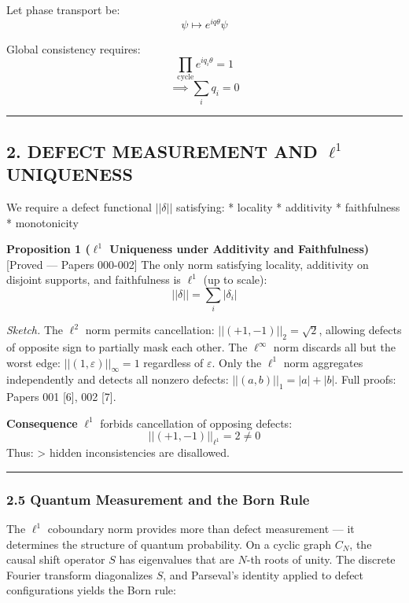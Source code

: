 \documentclass[
]{article}
\begin{document}
Let phase transport be: \[
\psi \mapsto e^{iq\theta} \psi
\]

Global consistency requires: \[
\prod_{\text{cycle}} e^{iq_i \theta} = 1
\] \[
\implies \sum_i q_i = 0
\]

\begin{center}\rule{0.5\linewidth}{0.5pt}\end{center}

\subsection{\texorpdfstring{2. DEFECT MEASUREMENT AND \(\ell^1\)
UNIQUENESS}{2. DEFECT MEASUREMENT AND \textbackslash ell\^{}1 UNIQUENESS}}\label{defect-measurement-and-ell1-uniqueness}

We require a defect functional \(||\delta||\) satisfying: * locality *
additivity * faithfulness * monotonicity

\textbf{Proposition 1 (\(\ell^1\) Uniqueness under Additivity and
Faithfulness)} {[}Proved --- Papers 000-002{]} The only norm satisfying
locality, additivity on disjoint supports, and faithfulness is
\(\ell^1\) (up to scale): \[
||\delta|| = \sum_i |\delta_i|
\]

\emph{Sketch.} The \(\ell^2\) norm permits cancellation:
\(||(+1,-1)||_2 = \sqrt{2}\), allowing defects of opposite sign to
partially mask each other. The \(\ell^\infty\) norm discards all but the
worst edge: \(||(1,\varepsilon)||_\infty = 1\) regardless of
\(\varepsilon\). Only the \(\ell^1\) norm aggregates independently and
detects all nonzero defects: \(||(a,b)||_1 = |a| + |b|\). Full proofs:
Papers 001 {[}6{]}, 002 {[}7{]}.

\textbf{Consequence} \(\ell^1\) forbids cancellation of opposing
defects: \[
||(+1, -1)||_{\ell^1} = 2 \neq 0
\] Thus: \textgreater{} hidden inconsistencies are disallowed.

\begin{center}\rule{0.5\linewidth}{0.5pt}\end{center}

\subsubsection{2.5 Quantum Measurement and the Born
Rule}\label{quantum-measurement-and-the-born-rule}

The \(\ell^1\) coboundary norm provides more than defect measurement ---
it determines the structure of quantum probability. On a cyclic graph
\(C_N\), the causal shift operator \(S\) has eigenvalues that are
\(N\)-th roots of unity. The discrete Fourier transform diagonalizes
\(S\), and Parseval's identity applied to defect configurations yields
the Born rule:
\end{document}
